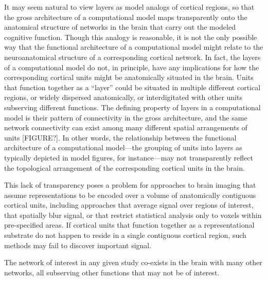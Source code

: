 \begin{APAenumerate}
It may seem natural to view layers as model analogs of cortical regions, so that the gross architecture of a computational model maps transparently onto the anatomical structure of networks in the brain that carry out the modeled cognitive function. Though this analogy is reasonable, it is not the only possible way that the functional architecture of a computational model might relate to the neuroanatomical structure of a corresponding cortical network. In fact, the layers of a computational model do not, in principle, have any implications for how the corresponding cortical units might be anatomically situated in the brain. Units that function together as a ``layer'' could be situated in multiple different cortical regions, or widely dispersed anatomically, or interdigitated with other units subserving different functions. The defining property of layers in a computational model is their pattern of connectivity in the gross architecture, and the same network connectivity can exist among many different spatial arrangements of units [FIGURE?]. In other words, the relationship between the functional architecture of a computational model---the grouping of units into layers as typically depicted in model figures, for instance---may not transparently reflect the topological arrangement of the corresponding cortical units in the brain. 

This lack of transparency poses a problem for approaches to brain imaging that assume representations to be encoded over a volume of anatomically contiguous cortical units, including approaches that average signal over regions of interest, that spatially blur signal, or that restrict statistical analysis only to voxels within pre-specified areas. If cortical units that function together as a representational substrate do not happen to reside in a single contiguous cortical region, such methods may fail to discover important signal.

\item The network of interest in any given study co-exists in the brain with many other networks, all subserving other functions that may not be of interest.


\end{APAenumerate}
